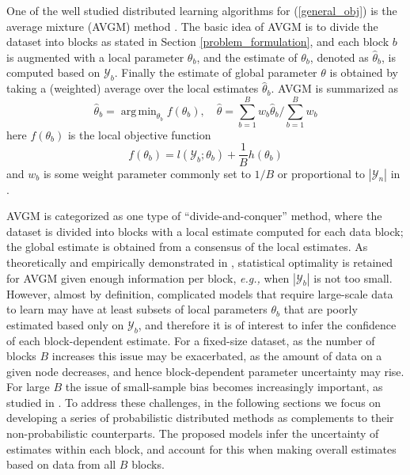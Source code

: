 \documentclass{article}
\DeclareMathOperator*{\argmin}{arg\,min}
\newcommand{\eg}[0]{\emph{e.g., }}
\newcommand{\1}[0]{\ensuremath{\boldsymbol{1}}\xspace}
\begin{document}
One of the well studied distributed learning algorithms for (\ref{general_obj}) is the average mixture (AVGM) method \cite{Mann2009, Zinkevich2010, YZhang2012}. The basic idea of AVGM is to divide the dataset into blocks as stated in Section \ref{problem_formulation}, and each block $b$ is augmented with a local parameter $\theta_b$, and the estimate of $\theta_b$, denoted as $\hat\theta_b$, is computed based on $\mathcal{Y}_b$. Finally the estimate of global parameter $\theta$ is obtained by taking a (weighted) average over the local estimates $\hat\theta_b$. AVGM is summarized as
\begin{equation}\label{avgm}
\hat\theta_b = \textstyle\argmin_{\theta_b}f(\theta_b), \quad \hat\theta = \textstyle\sum_{b=1}^B w_b\hat\theta_b/\sum_{b=1}^Bw_b
\end{equation} 
here $f(\theta_b)$ is the local objective function
\begin{equation}\label{avgm_local}
\textstyle f(\theta_b) = l(\mathcal{Y}_b; \theta_b)+\frac{1}{B}h(\theta_b)
\end{equation}
and $w_b$ is some weight parameter commonly set to $1/B$ \cite{Mann2009, Zinkevich2010} or proportional to $|\mathcal{Y}_n|$ in \cite{YZhang2012}. 

AVGM is categorized as one type of ``divide-and-conquer'' method, where the dataset is divided into blocks with a local estimate computed for each data block; the global estimate is obtained from a consensus of the local estimates. As theoretically and empirically demonstrated in \cite{YZhang2012}, statistical optimality is retained for AVGM given enough information per block, \eg when $|\mathcal{Y}_b|$ is not too small. However, almost by definition, complicated models that require large-scale data to learn may have at least subsets of local parameters $\theta_b$ that are poorly estimated based only on $\mathcal{Y}_b$, and therefore it is of interest to infer the confidence of each block-dependent estimate. For a fixed-size dataset, as the number of blocks $B$ increases this issue may be exacerbated, as the amount of data on a given node decreases, and hence block-dependent parameter uncertainty may rise. For large $B$ the issue of small-sample bias becomes increasingly important, as studied in \cite{YZhang2012, Scott2013}. To address these challenges, in the following sections we focus on developing a series of probabilistic distributed methods as complements to their non-probabilistic counterparts. The proposed models infer the uncertainty of estimates within each block, and account for this when making overall estimates based on data from all $B$ blocks.
\end{document}
